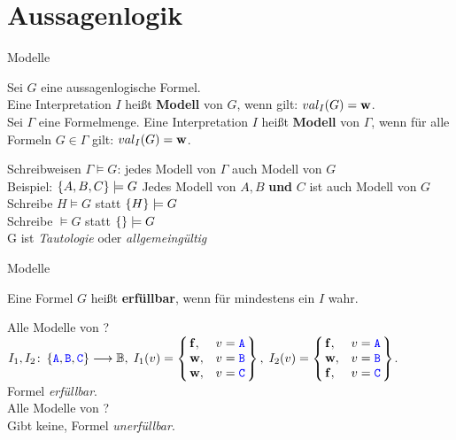 \section{Aussagenlogik}

\begin{frame}{Modelle}
	\begin{Definition}
		Sei $G$ eine aussagenlogische Formel. \\
		Eine Interpretation $I$ heißt \textbf{Modell} von $G$, wenn gilt: \quad $val_I(G) = \hbox{\textbf{w}}$. \\
		\pause
		\medskip
		Sei $\Gamma$ eine Formelmenge.
		Eine Interpretation $I$ heißt \textbf{Modell} von $\Gamma$, wenn für alle Formeln $G \in  \Gamma$ gilt: \quad $val_I(G) = \hbox{\textbf{w}}$.
	\end{Definition}
	\bigskip
	\pause
	\begin{block}{Schreibweisen}
		$\Gamma \models G$: jedes Modell von $\Gamma$ auch Modell von $G$ \\
		Beispiel: \quad $\left\{A,B,C\right\} \models G$ \quad Jedes Modell von $A, B$ \textbf{und} $C$ ist auch Modell von $G$ \\
		\medskip
		Schreibe $H \models G$ statt $\left\{H\right\} \models G$ \\
		\medskip
		Schreibe $\models G$ statt $\left\{\right\} \models G$ \\
		\impl G ist \emph{Tautologie} oder \emph{allgemeingültig} 
	\end{block}
\end{frame}

\begin{frame}{Modelle}
	\begin{Definition}
		Eine Formel $G$ heißt \textbf{erfüllbar}, wenn für mindestens ein $I$ wahr. \\
		
	\end{Definition}
	\pause
	\begin{Beispiel}
		Alle Modelle von \mword{(C \boder \bnot C) \bimp \left(\bnot(B \bimp A)\right)}? \\
		\pause
		\impl $I_1, I_2 \from \set{\word A, \word B, \word C} \functionto \BB, \; 
		I_1(v) = 
		\caseslr{\F, & v = \word A \\
				\W, & v = \word B \\
				\W, & v = \word C}, \;
		I_2(v) = 
		\caseslr{\F, & v = \word A \\
				\W, & v = \word B \\
				\F, & v = \word C}$. \\
		\impl Formel \emph{erfüllbar}. \\
		\pause
		\medskip
		Alle Modelle von \mword{\bnot(C \bimp C)}? \\
		\pause
		\impl Gibt keine, Formel \emph{unerfüllbar}.
	\end{Beispiel}
\end{frame}


